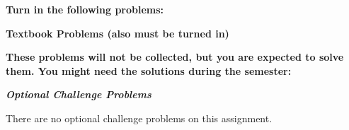 
\noindent\textbf{Turn in the following problems:}
\begin{enumerate}
  \setcounter{enumcount}{\value{enumi}}
\end{enumerate}

\noindent \textbf{Textbook Problems (also must be turned in)}
\begin{enumerate}
  \setcounter{enumi}{\value{enumcount}}
  \setcounter{enumcount}{\value{enumi}}
\end{enumerate}

\noindent\textbf{These problems will not be collected, but you are expected to solve them. You might need the solutions during the semester:}
\begin{enumerate}
  \setcounter{enumi}{\value{enumcount}}
  \setcounter{enumcount}{\value{enumi}}
\end{enumerate}

\begin{center}
	\textbf{\emph{Optional Challenge Problems}}
\end{center}
There are no optional challenge problems on this assignment.

